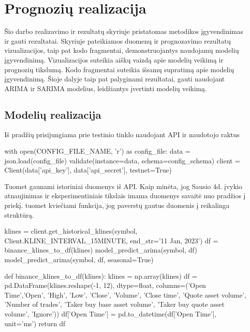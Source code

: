 \documentclass{VUMIFInfKursinis}
\begin{document}

\section{Prognozių realizacija}
Šio darbo realizavimo ir rezultatų skyriuje pristatomas metodikos įgyvendinimas ir gauti rezultatai. 
Skyriuje pateikiamos duomenų ir prognozavimo rezultatų vizualizacijos, taip pat kodo fragmentai, demonstruojantys naudojamų modelių įgyvendinimą.
Vizualizacijos suteikia aiškų vaizdą apie modelių veikimą ir prognozių tikslumą. 
Kodo fragmentai suteikia išsamų supratimą apie modelių įgyvendinimą. 
Šioje dalyje taip pat palyginami rezultatai, gauti naudojant ARIMA ir SARIMA modelius, leidžiantys įvertinti modelių veikimą.
\subsection{Modelių realizacija}

Iš pradžių prisijungiama prie testinio tinklo naudojant API ir naudotojo raktus

\begin{python}
  with open(CONFIG_FILE_NAME, 'r') as config_file:
  data = json.load(config_file)
  validate(instance=data, schema=config_schema)
  client = Client(data['api_key'], data['api_secret'], testnet=True)
\end{python}

Tuomet gaunami istoriniai duomenys iš API. Kaip minėta, jog Sausio 4d. įvykio atnaujinimas ir eksperimentiniais tikslais imama duomenys savaitė nuo pradžios į priekį.
tuomet kviečiami funkcija, jog paverstų gautus duomenis į reikalinga struktūrą.

\begin{python}
  klines = client.get_historical_klines(symbol, Client.KLINE_INTERVAL_15MINUTE, end_str='11 Jan, 2023')
  df = binance_klines_to_df(klines)
  model_predict_arima(symbol, df)
  model_predict_arima(symbol, df, seasonal=True)
  
  def binance_klines_to_df(klines):
  klines = np.array(klines)
  df = pd.DataFrame(klines.reshape(-1, 12), dtype=float, columns=('Open Time','Open', 'High', 'Low', 'Close', 'Volume', 'Close time', 'Quote asset volume', 'Number of trades', 'Taker  buy base asset volume', 'Taker buy quote asset volume', 'Ignore'))
  df['Open Time'] = pd.to_datetime(df['Open Time'], unit='ms')
  return df
\end{python}
\end{document}
